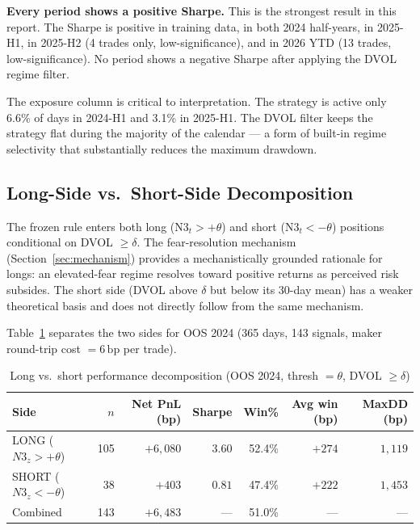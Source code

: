 \documentclass[12pt, a4paper]{article}
\theoremstyle{plain}
\theoremstyle{definition}
\newcommand{\bp}{\,\mathrm{bp}}
\begin{document}
\textbf{Every period shows a positive Sharpe.} This is the strongest result
in this report. The Sharpe is positive in training data, in both 2024 half-years,
in 2025-H1, in 2025-H2 (4 trades only, low-significance), and in 2026 YTD
(13 trades, low-significance). No period shows a negative Sharpe after applying
the DVOL regime filter.

The exposure column is critical to interpretation. The strategy is active
only 6.6\% of days in 2024-H1 and 3.1\% in 2025-H1. The DVOL filter
keeps the strategy flat during the majority of the calendar --- a form
of built-in regime selectivity that substantially reduces the maximum drawdown.

\subsection{Long-Side vs.\ Short-Side Decomposition}
\label{sec:longshort_decomp}

The frozen rule enters both long (N3$_t > +\theta$) and short (N3$_t < -\theta$)
positions conditional on DVOL $\geq \delta$.  The fear-resolution mechanism
(Section~\ref{sec:mechanism}) provides a mechanistically grounded rationale
for longs: an elevated-fear regime resolves toward positive returns as
perceived risk subsides.  The short side (DVOL above $\delta$ but below its
30-day mean) has a weaker theoretical basis and does not directly follow
from the same mechanism.

Table~\ref{tab:longshort_decomp} separates the two sides for OOS 2024
(365 days, 143 signals, maker round-trip cost $= 6\bp$ per trade).

\begin{table}[H]
\centering
\caption{Long vs.\ short performance decomposition (OOS 2024,
  thresh $= \theta$, DVOL $\geq \delta$)}
\label{tab:longshort_decomp}
\begin{tabular}{lrrrrrr}
\toprule
Side & $n$ & Net PnL (bp) & Sharpe & Win\% & Avg win (bp) & MaxDD (bp) \\
\midrule
LONG  ($N3_z > +\theta$) & 105 & $+6{,}080$ & $3.60$ & 52.4\% & $+274$ & $1{,}119$ \\
SHORT ($N3_z < -\theta$) &  38 & $+403$     & $0.81$ & 47.4\% & $+222$ & $1{,}453$ \\
\midrule
Combined               & 143 & $+6{,}483$ & ---    & 51.0\% & ---    & ---       \\
\bottomrule
\end{tabular}
\end{table}
\end{document}
